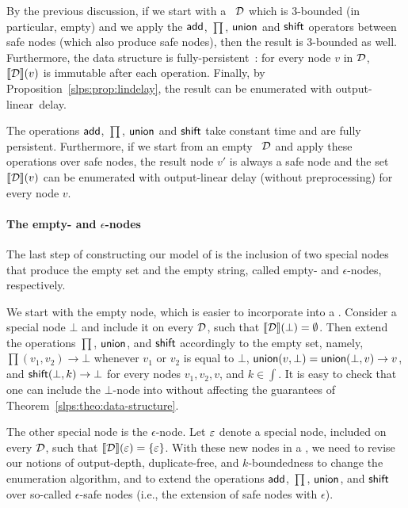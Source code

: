 By the previous discussion, if we start with a \dsabbr\ $\mathcal{D}$ which is 3-bounded (in particular, empty) and we apply the $\mathsf{add}$, $\prod$, $\mathsf{union}$ and $\mathsf{shift}$ operators between safe nodes (which also produce safe nodes), then the result is 3-bounded as well.
Furthermore, the data structure is fully-persistent~\cite{DriscollSST86}: for every node $v$ in $\mathcal{D}$, ${\llbracket{\mathcal{D}}\rrbracket}(v)$ is immutable after each operation. Finally, by Proposition~\ref{slps:prop:lindelay}, the result can be enumerated with output-linear~delay.

\begin{theorem}\label{slps:theo:data-structure}
	The operations $\mathsf{add}$, $\prod$, $\mathsf{union}$ and $\mathsf{shift}$ take constant time and are fully persistent. Furthermore, if we start from an empty \dsabbr\ $\mathcal{D}$ and apply these operations over safe nodes, the result node $v'$ is always a safe node and the set ${\llbracket{\mathcal{D}}\rrbracket}(v)$ can be enumerated with output-linear delay (without preprocessing) for every node $v$.
\end{theorem} 


\paragraph{The empty- and $\epsilon$-nodes} 
The last step of constructing our model of \dsabbr{} is the inclusion of two special nodes that produce the empty set and the empty string, called empty- and $\epsilon$-nodes, respectively. 

We start with the empty node, which is easier to incorporate into a \dsabbr{}. Consider a special node $\bot$ and include it on every \dsabbr{} $\mathcal{D}$, such that ${\llbracket{\mathcal{D}}\rrbracket}(\bot) = \emptyset$. 
Then extend the operations $\prod$, $\mathsf{union}$, and $\mathsf{shift}$ accordingly to the empty set, namely, $\prod(v_1, v_2) \to \bot$ whenever $v_1$ or $v_2$ is equal to $\bot$, $\mathsf{union}(v, \bot) = \mathsf{union}(\bot, v) \to v$, and $\mathsf{shift}(\bot, k) \to \bot$ for every nodes $v_1, v_2, v$, and $k \in \int$. It is easy to check that one can include the $\bot$-node into \dsabbrs{} without affecting the guarantees of Theorem~\ref{slps:theo:data-structure}.

The other special node is the $\epsilon$-node. Let $\varepsilon$ denote a special node, included on every \dsabbr{} $\mathcal{D}$, such that ${\llbracket{\mathcal{D}}\rrbracket}(\varepsilon) = \{\varepsilon\}$. With these new nodes in a \dsabbr{}, we need to revise our notions of output-depth, duplicate-free, and $k$-boundedness to change the enumeration algorithm, and to extend the operations $\mathsf{add}$, $\prod$, $\mathsf{union}$, and $\mathsf{shift}$ over so-called $\epsilon$-safe nodes (i.e., the extension of safe nodes with $\epsilon$). 

